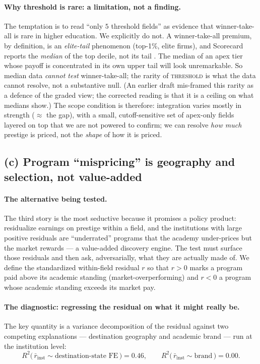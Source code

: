 \documentclass[11pt]{article}
\begin{document}
\paragraph{Why threshold is rare: a limitation, not a finding.} The temptation is to read ``only $5$ threshold fields'' as evidence that winner-take-all is rare in higher education. We explicitly do not. A winner-take-all premium, by definition, is an \emph{elite-tail} phenomenon (top-1\%, elite firms), and Scorecard reports the \emph{median} of the top decile, not its tail \citep{chetty2023diversifying}. The median of an apex tier whose payoff is concentrated in its own upper tail will look unremarkable. So median data \emph{cannot test} winner-take-all; the rarity of \textsc{threshold} is what the data cannot resolve, not a substantive null. (An earlier draft mis-framed this rarity as a defence of the graded view; the corrected reading is that it is a ceiling on what medians show.) The scope condition is therefore: integration varies mostly in strength ($\approx$ the gap), with a small, cutoff-sensitive set of apex-only fields layered on top that we are not powered to confirm; we can resolve \emph{how much} prestige is priced, not the \emph{shape} of how it is priced.

\subsection{(c) Program ``mispricing'' is geography and selection, not value-added}

\paragraph{The alternative being tested.} The third story is the most seductive because it promises a policy product: residualize earnings on prestige within a field, and the institutions with large positive residuals are ``underrated'' programs that the academy under-prices but the market rewards --- a value-added discovery engine. The test must surface those residuals and then ask, adversarially, what they are actually made of. We define the standardized within-field residual $r$ so that $r>0$ marks a program paid above its academic standing (market-overperforming) and $r<0$ a program whose academic standing exceeds its market pay.

\paragraph{The diagnostic: regressing the residual on what it might really be.} The key quantity is a variance decomposition of the residual against two competing explanations --- destination geography and academic brand --- run at the institution level:
\[
R^2\big(\,\bar r_{\text{inst}} \sim \text{destination-state FE}\,\big) = 0.46,
\qquad
R^2\big(\,\bar r_{\text{inst}} \sim \text{brand}\,\big) = 0.00 .
\]
\end{document}
